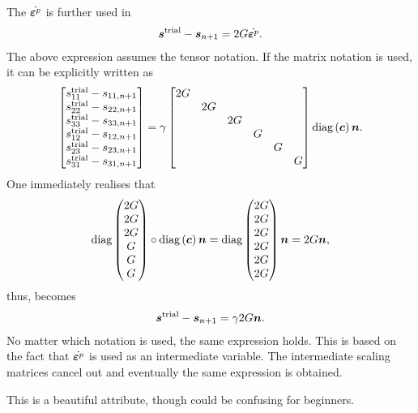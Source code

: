 The $\dot{\bm{\varepsilon}^p}$ is further used in
\begin{gather}\label{eq:j2_two_form}
    \bm{s}^\text{trial}-\bm{s}_{n+1}=2G\dot{\bm{\varepsilon}^p}.
\end{gather}
The above expression assumes the tensor notation.
If the matrix notation is used, it can be explicitly written as
\begin{gather}
    \begin{bmatrix}
        s^\text{trial}_{11}-s_{11,n+1} \\
        s^\text{trial}_{22}-s_{22,n+1} \\
        s^\text{trial}_{33}-s_{33,n+1} \\
        s^\text{trial}_{12}-s_{12,n+1} \\
        s^\text{trial}_{23}-s_{23,n+1} \\
        s^\text{trial}_{31}-s_{31,n+1}
    \end{bmatrix}=\gamma\begin{bmatrix}
        2G &    &    &   &   &   \\
           & 2G &    &   &   &   \\
           &    & 2G &   &   &   \\
           &    &    & G &   &   \\
           &    &    &   & G &   \\
           &    &    &   &   & G
    \end{bmatrix}\text{diag}\left(\bm{c}\right)\bm{n}.
\end{gather}
One immediately realises that
\begin{gather}
    \text{diag}\left(\begin{matrix}
            2G \\2G\\2G\\G\\G\\G
        \end{matrix}\right)\circ\text{diag}\left(\bm{c}\right)\bm{n}=\text{diag}\left(\begin{matrix}
            2G \\2G\\2G\\2G\\2G\\2G
        \end{matrix}\right)\bm{n}=2G\bm{n},
\end{gather}
thus,  becomes
\begin{gather}
    \bm{s}^\text{trial}-\bm{s}_{n+1}=\gamma2G\bm{n}.
\end{gather}
No matter which notation is used, the same expression holds.
This is based on the fact that $\dot{\bm{\varepsilon}^p}$ is used as an intermediate variable.
The intermediate scaling matrices cancel out and eventually the same expression is obtained.

This is a beautiful attribute, though could be confusing for beginners.
